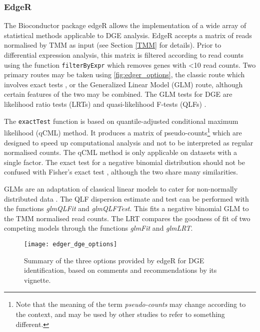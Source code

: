 \subsubsection{EdgeR}
\label{EdgeR}

The Bioconductor package edgeR allows the implementation of a wide array of statistical methods applicable to \ac{DGE} analysis. EdgeR accepts a matrix of reads normalised by \ac{TMM} as input (see Section \ref{TMM} for details). Prior to differential expression analysis, this matrix is filtered according to read counts using the function \texttt{filterByExpr} which removes genes with <10 read counts. Two primary routes may be taken using \autoref{fig:edger_options}, the classic route which involves exact tests \citep{robinson2007moderated, robinson2008small}, or the Generalized Linear Model (GLM) route, although certain features of the two may be combined. The GLM tests for \ac{DGE} are likelihood ratio tests (LRTs) \citep{mccarthy2012differential} and quasi-likelihood F-tests (QLFs) \citep{lun2016s, lund2012detecting}.

The \texttt{exactTest} function is based on quantile-adjusted conditional maximum likelihood (qCML) method. It produces a matrix of pseudo-counts\footnote{Note that the meaning of the term \textit{pseudo-counts} may change according to the context, and may be used by other studies to refer to something different.} which are designed to speed up computational analysis and not to be interpreted as regular normalised counts. The qCML method is only applicable on datasets with a single factor. The exact test for a negative binomial distribution should not be confused with Fisher’s exact test \citep{upton1992fisher}, although the two share many similarities.

GLMs are an adaptation of classical linear models to cater for non-normally distributed data \citep{dunn2018generalized}. The QLF dispersion estimate and test can be performed with the functions \textit{glmQLFit} and \textit{glmQLFTest}. This fits a negative binomial GLM to the \ac{TMM} normalised read counts. The LRT compares the goodness of fit of two competing models through the functions \textit{glmFit} and \textit{glmLRT}.

\begin{figure}[h!]
    \centering
    \texttt{[image: edger\_dge\_options]}
    \caption[Summary of the options provided by edgeR for DGE identification]{Summary of the three options provided by edgeR for \ac{DGE} identification, based on comments and recommendations by its vignette. } 
    \label{fig:edger_options}
\end{figure}

